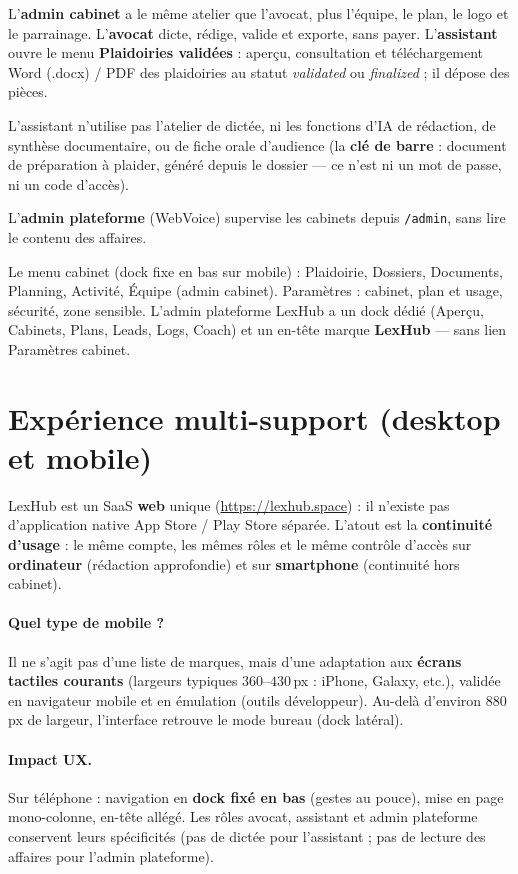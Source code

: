 L'\textbf{admin cabinet} a le même atelier que l'avocat, plus l'équipe, le plan, le logo et le parrainage. L'\textbf{avocat} dicte, rédige, valide et exporte, sans payer. L'\textbf{assistant} ouvre le menu \textbf{Plaidoiries validées} : aperçu, consultation et téléchargement Word (.docx) / PDF des plaidoiries au statut \textit{validated} ou \textit{finalized} ; il dépose des pièces.

L'assistant n'utilise pas l'atelier de dictée, ni les fonctions d'IA de rédaction, de synthèse documentaire, ou de fiche orale d'audience (la \textbf{clé de barre} : document de préparation à plaider, généré depuis le dossier --- ce n'est ni un mot de passe, ni un code d'accès).

L'\textbf{admin plateforme} (WebVoice) supervise les cabinets depuis \texttt{/admin}, sans lire le contenu des affaires.

Le menu cabinet (dock fixe en bas sur mobile) : Plaidoirie, Dossiers, Documents, Planning, Activité, Équipe (admin cabinet). Paramètres : cabinet, plan et usage, sécurité, zone sensible. L'admin plateforme LexHub a un dock dédié (Aperçu, Cabinets, Plans, Leads, Logs, Coach) et un en-tête marque \textbf{LexHub} --- sans lien Paramètres cabinet.

\section{Expérience multi-support (desktop et mobile)}
\label{sec:mobile}

LexHub est un SaaS \textbf{web} unique (\url{https://lexhub.space}) : il n'existe pas d'application native App Store / Play Store séparée. L'atout est la \textbf{continuité d'usage} : le même compte, les mêmes rôles et le même contrôle d'accès sur \textbf{ordinateur} (rédaction approfondie) et sur \textbf{smartphone} (continuité hors cabinet).

\paragraph{Quel type de mobile ?}
Il ne s'agit pas d'une liste de marques, mais d'une adaptation aux \textbf{écrans tactiles courants} (largeurs typiques $360$--$430$\,px : iPhone, Galaxy, etc.), validée en navigateur mobile et en émulation (outils développeur). Au-delà d'environ $880$\,px de largeur, l'interface retrouve le mode bureau (dock latéral).

\paragraph{Impact UX.}
Sur téléphone : navigation en \textbf{dock fixé en bas} (gestes au pouce), mise en page mono-colonne, en-tête allégé. Les rôles avocat, assistant et admin plateforme conservent leurs spécificités (pas de dictée pour l'assistant ; pas de lecture des affaires pour l'admin plateforme).


